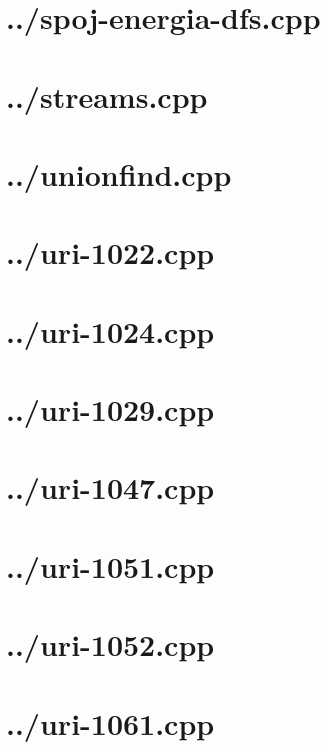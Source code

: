 \documentclass{article}
\begin{document}
\section*{../spoj-energia-dfs.cpp}


\section*{../streams.cpp}


\section*{../unionfind.cpp}


\section*{../uri-1022.cpp}


\section*{../uri-1024.cpp}


\section*{../uri-1029.cpp}


\section*{../uri-1047.cpp}


\section*{../uri-1051.cpp}


\section*{../uri-1052.cpp}


\section*{../uri-1061.cpp}

\end{document}
